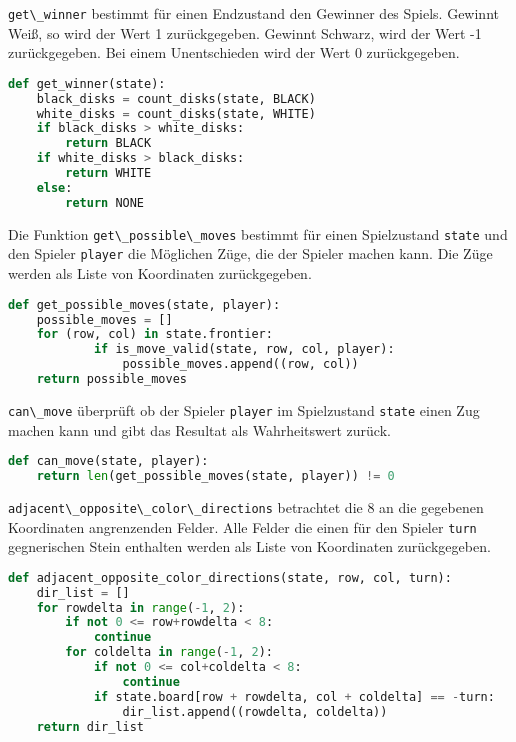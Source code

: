 \passthrough{\lstinline!get\_winner!} bestimmt für einen Endzustand den
Gewinner des Spiels. Gewinnt Weiß, so wird der Wert 1 zurückgegeben.
Gewinnt Schwarz, wird der Wert -1 zurückgegeben. Bei einem Unentschieden
wird der Wert 0 zurückgegeben.

\begin{lstlisting}[language=Python]
def get_winner(state):
    black_disks = count_disks(state, BLACK)
    white_disks = count_disks(state, WHITE)
    if black_disks > white_disks:
        return BLACK
    if white_disks > black_disks:
        return WHITE
    else:
        return NONE
\end{lstlisting}

Die Funktion \passthrough{\lstinline!get\_possible\_moves!} bestimmt für
einen Spielzustand \passthrough{\lstinline!state!} und den Spieler
\passthrough{\lstinline!player!} die Möglichen Züge, die der Spieler
machen kann. Die Züge werden als Liste von Koordinaten zurückgegeben.

\begin{lstlisting}[language=Python]
def get_possible_moves(state, player):
    possible_moves = []
    for (row, col) in state.frontier:
            if is_move_valid(state, row, col, player):
                possible_moves.append((row, col))
    return possible_moves
\end{lstlisting}

\passthrough{\lstinline!can\_move!} überprüft ob der Spieler
\passthrough{\lstinline!player!} im Spielzustand
\passthrough{\lstinline!state!} einen Zug machen kann und gibt das
Resultat als Wahrheitswert zurück.

\begin{lstlisting}[language=Python]
def can_move(state, player):
    return len(get_possible_moves(state, player)) != 0
\end{lstlisting}

\passthrough{\lstinline!adjacent\_opposite\_color\_directions!}
betrachtet die 8 an die gegebenen Koordinaten angrenzenden Felder. Alle
Felder die einen für den Spieler \passthrough{\lstinline!turn!}
gegnerischen Stein enthalten werden als Liste von Koordinaten
zurückgegeben.

\begin{lstlisting}[language=Python]
def adjacent_opposite_color_directions(state, row, col, turn):
    dir_list = []
    for rowdelta in range(-1, 2):
        if not 0 <= row+rowdelta < 8:
            continue
        for coldelta in range(-1, 2):
            if not 0 <= col+coldelta < 8:
                continue
            if state.board[row + rowdelta, col + coldelta] == -turn:
                dir_list.append((rowdelta, coldelta))
    return dir_list
\end{lstlisting}

